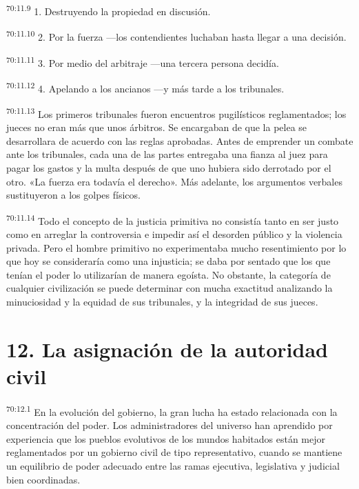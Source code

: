 \par
\textsuperscript{70:11.9} 1. Destruyendo la propiedad en discusión.

\par
\textsuperscript{70:11.10} 2. Por la fuerza ---los contendientes luchaban hasta llegar a una decisión.

\par
\textsuperscript{70:11.11} 3. Por medio del arbitraje ---una tercera persona decidía.

\par
\textsuperscript{70:11.12} 4. Apelando a los ancianos ---y más tarde a los tribunales.

\par
\textsuperscript{70:11.13} Los primeros tribunales fueron encuentros pugilísticos reglamentados; los jueces no eran más que unos árbitros. Se encargaban de que la pelea se desarrollara de acuerdo con las reglas aprobadas. Antes de emprender un combate ante los tribunales, cada una de las partes entregaba una fianza al juez para pagar los gastos y la multa después de que uno hubiera sido derrotado por el otro. «La fuerza era todavía el derecho». Más adelante, los argumentos verbales sustituyeron a los golpes físicos.

\par
\textsuperscript{70:11.14} Todo el concepto de la justicia primitiva no consistía tanto en ser justo como en arreglar la controversia e impedir así el desorden público y la violencia privada. Pero el hombre primitivo no experimentaba mucho resentimiento por lo que hoy se consideraría como una injusticia; se daba por sentado que los que tenían el poder lo utilizarían de manera egoísta. No obstante, la categoría de cualquier civilización se puede determinar con mucha exactitud analizando la minuciosidad y la equidad de sus tribunales, y la integridad de sus jueces.

\section*{12. La asignación de la autoridad civil}
\par
\textsuperscript{70:12.1} En la evolución del gobierno, la gran lucha ha estado relacionada con la concentración del poder. Los administradores del universo han aprendido por experiencia que los pueblos evolutivos de los mundos habitados están mejor reglamentados por un gobierno civil de tipo representativo, cuando se mantiene un equilibrio de poder adecuado entre las ramas ejecutiva, legislativa y judicial bien coordinadas.

